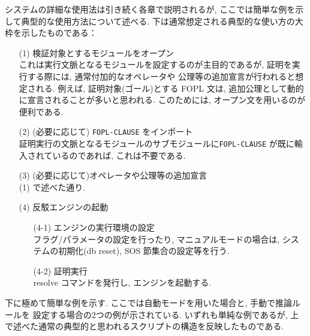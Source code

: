 システムの詳細な使用法は引き続く各章で説明されるが,
ここでは簡単な例を示して典型的な使用方法について述べる.
下は通常想定される典型的な使い方の大枠を示したものである：
\begin{enumerate}
\item[(1)] 検証対象とするモジュールをオープン\\
  これは実行文脈となるモジュールを設定するのが主目的であるが,
  証明を実行する際には, 通常付加的なオペレータや
  公理等の追加宣言が行われると想定される. 
  例えば, 証明対象(ゴール)とする FOPL 文は,
  追加公理として動的に宣言されることが多いと思われる.
  このためには, オープン文を用いるのが便利である.

\item[(2)] (必要に応じて) \texttt{FOPL-CLAUSE} をインポート\\
  証明実行の文脈となるモジュールのサブモジュールに\texttt{FOPL-CLAUSE}
  が既に輸入されているのであれば, これは不要である.

\item[(3)] (必要に応じて)オペレータや公理等の追加宣言\\
  (1) で述べた通り.

\item[(4)] 反駁エンジンの起動
  \begin{enumerate}
  \item[(4-1)] エンジンの実行環境の設定\\
    フラグ/パラメータの設定を行ったり, 
    マニュアルモードの場合は, システムの初期化(db reset),
    SOS 節集合の設定等を行う.
  \item[(4-2)] 証明実行 \\
    resolve コマンドを発行し, エンジンを起動する.
  \end{enumerate}
\end{enumerate}

下に極めて簡単な例を示す.
ここでは自動モードを用いた場合と, 手動で推論ルールを
設定する場合の2つの例が示されている. 
いずれも単純な例であるが, 
上で述べた通常の典型的と思われるスクリプトの構造を反映したものである.

